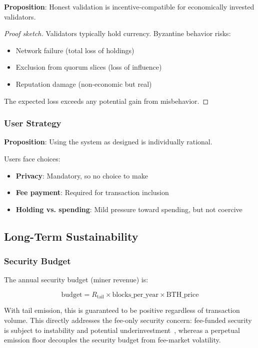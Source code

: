 \textbf{Proposition}: Honest validation is incentive-compatible for
economically invested validators.

\begin{proof}[Proof sketch]
Validators typically hold currency. Byzantine behavior risks:
\begin{itemize}
  \item Network failure (total loss of holdings)
  \item Exclusion from quorum slices (loss of influence)
  \item Reputation damage (non-economic but real)
\end{itemize}
The expected loss exceeds any potential gain from misbehavior.
\end{proof}

\subsubsection{User Strategy}

\textbf{Proposition}: Using the system as designed is individually rational.

Users face choices:
\begin{itemize}
  \item \textbf{Privacy}: Mandatory, so no choice to make
  \item \textbf{Fee payment}: Required for transaction inclusion
  \item \textbf{Holding vs. spending}: Mild pressure toward spending,
    but not coercive
\end{itemize}

\subsection{Long-Term Sustainability}

\subsubsection{Security Budget}

The annual security budget (miner revenue) is:

\begin{equation}
\text{budget} = R_{\text{tail}} \times \text{blocks\_per\_year} \times \text{BTH\_price}
\end{equation}

With tail emission, this is guaranteed to be positive regardless of
transaction volume. This directly addresses the fee-only security concern:
fee-funded security is subject to instability and potential
underinvestment~\cite{budish2022,huberman2021}, whereas a perpetual emission
floor decouples the security budget from fee-market volatility.

